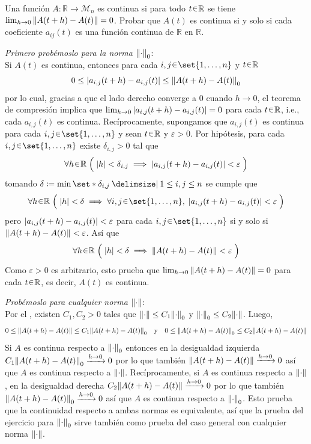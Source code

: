 \begin{ejer}
Una función $A : \mathbb{R} \to \mathcal{M}_n$ es continua si para todo $t \en \mathbb{R}$ se tiene $\lim_{h\to 0} \norm{A(t+h) - A(t)} = 0$. Probar que $A(t)$ es continua si y solo si cada coeficiente $a_{ij}(t)$ es una función continua de $\mathbb{R}$ en $\mathbb{R}$.
\end{ejer}
\begin{sol}[Demostración]
\emph{Primero probémoslo para la norma $\norm{\cdot}_0$}:\\
Si $A(t)$ es continua, entonces para cada $i,j \en \set{1,\dots,n}$ y $t \en \mathbb{R}$
\[
0 \leq \abs{a_{i,j}(t+h) - a_{i,j}(t)} \leq \norm{A(t+h) - A(t)}_0
\]
por lo cual, gracias a que el lado derecho converge a $0$ cuando $h \to 0$, el teorema de compresión implica que $\lim_{h\to0} \abs{a_{i,j}(t+h) - a_{i,j}(t)} = 0$ para cada $t \en \mathbb{R}$, i.e., cada $a_{i,j}(t)$ es continua. Recíprocamente, supongamos que $a_{i,j}(t)$ es continua para cada $i,j \en \set{1,\dots,n}$ y sean $t \en \mathbb{R}$ y $\varepsilon > 0$. Por hipótesis, para cada $i,j \en \set{1,\dots,n}$ existe $\delta_{i,j} >0$ tal que 
\[
\forall h \en \mathbb{R}\;%
\Big(\;%
    \abs{h} < \delta_{i,j} \implies \abs{a_{i,j}(t+h) - a_{i,j}(t)} < \varepsilon
\;\Big)
\]
tomando $\delta \coloneq \min\set*{\delta_{i,j} \given 1\leq i,j\leq n}$ se cumple que
\[
\forall h \en \mathbb{R}\;\Big(\;%
\abs{h} < \delta \implies  \forall i,j \en \set{1,\dots,n},\; \abs{a_{i,j}(t+h) - a_{i,j}(t)} < \varepsilon
\;\Big)
\]
pero $\abs{a_{i,j}(t+h) - a_{i,j}(t)} < \varepsilon$ para cada $i,j \en \set{1,\dots,n}$ si y solo si $\norm{A(t+h) - A(t)} < \varepsilon$. Así que
\[
\forall h \en \mathbb{R}\;%
\Big(\;%
    \abs{h} < \delta \implies \norm{A(t+h) - A(t)} < \varepsilon
\;\Big)
\]
Como $\varepsilon > 0$ es arbitrario, esto prueba que $\lim_{h\to 0} \norm{A(t+h) - A(t)} = 0$ para cada $t \en \mathbb{R}$, es decir, $A(t)$ es continua.\par\vspace{1em}
\emph{Probémoslo para cualquier norma $\norm{\cdot}$}:\\
Por el , existen $C_1,C_2 > 0$ tales que $\norm{\cdot} \leq C_1 \norm{\cdot}_0$ y $\norm{\cdot}_0 \leq C_2 \norm{\cdot}$. Luego, 
\[
0 \leq \norm{A(t+h) - A(t)} \leq C_1\norm{A(t+h) - A(t)}_0%
\quad\text{y}\quad%
0 \leq \norm{A(t+h) - A(t)}_0 \leq C_2\norm{A(t+h) - A(t)}
\]
Si $A$ es continua respecto a $\norm{\cdot}_0$ entonces en la desigualdad izquierda $C_1\norm{A(t+h) - A(t)}_0 \xrightarrow{h\to0}0$ por lo que también $\norm{A(t+h) - A(t)} \xrightarrow{h\to0}0$ así que $A$ es continua respecto a $\norm{\cdot}$. Recíprocamente, si $A$ es continua respecto a $\norm{\cdot}$, en la desigualdad derecha $C_2\norm{A(t+h) - A(t)} \xrightarrow{h\to0}0$ por lo que también $\norm{A(t+h) - A(t)}_0 \xrightarrow{h\to0}0$ así que $A$ es continua respecto a $\norm{\cdot}_0$. Esto prueba que la continuidad respecto a ambas normas es equivalente, así que la prueba del ejercicio para $\norm{\cdot}_0$ sirve también como prueba del caso general con cualquier norma $\norm{\cdot}$.
\end{sol}

